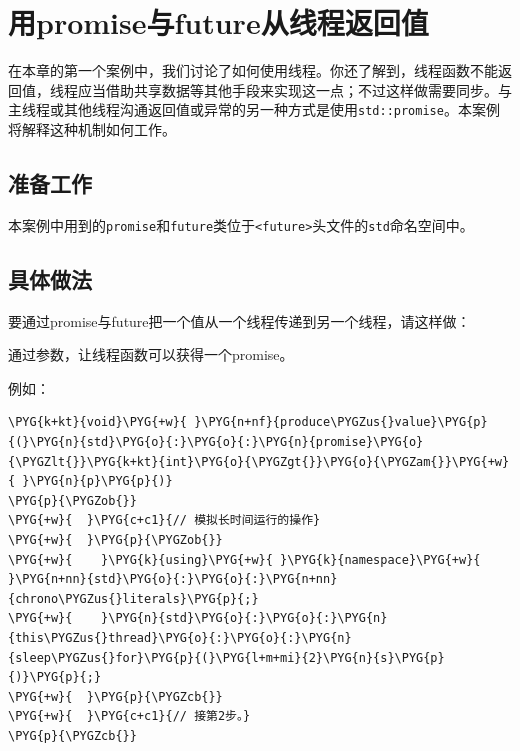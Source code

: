 
\section{用promise与future从线程返回值}



在本章的第一个案例中，我们讨论了如何使用线程。你还了解到，线程函数不能返回值，线程应当借助共享数据等其他手段来实现这一点；不过这样做需要同步。与主线程或其他线程沟通返回值或异常的另一种方式是使用\texttt{std::\allowbreak{}promise}。本案例将解释这种机制如何工作。



\subsection{准备工作}



本案例中用到的\texttt{promise}和\texttt{future}类位于\texttt{<\allowbreak{}future>}头文件的\texttt{std}命名空间中。



\subsection{具体做法}



要通过promise与future把一个值从一个线程传递到另一个线程，请这样做：



通过参数，让线程函数可以获得一个promise。



例如：



\begin{codeblockbg}
\begin{Verbatim}[commandchars=\\\{\},breaklines=true,breakanywhere=true,fontsize=\codefont,xleftmargin=17bp]
\PYG{k+kt}{void}\PYG{+w}{ }\PYG{n+nf}{produce\PYGZus{}value}\PYG{p}{(}\PYG{n}{std}\PYG{o}{:}\PYG{o}{:}\PYG{n}{promise}\PYG{o}{\PYGZlt{}}\PYG{k+kt}{int}\PYG{o}{\PYGZgt{}}\PYG{o}{\PYGZam{}}\PYG{+w}{ }\PYG{n}{p}\PYG{p}{)}
\PYG{p}{\PYGZob{}}
\PYG{+w}{  }\PYG{c+c1}{// 模拟长时间运行的操作}
\PYG{+w}{  }\PYG{p}{\PYGZob{}}
\PYG{+w}{    }\PYG{k}{using}\PYG{+w}{ }\PYG{k}{namespace}\PYG{+w}{ }\PYG{n+nn}{std}\PYG{o}{:}\PYG{o}{:}\PYG{n+nn}{chrono\PYGZus{}literals}\PYG{p}{;}
\PYG{+w}{    }\PYG{n}{std}\PYG{o}{:}\PYG{o}{:}\PYG{n}{this\PYGZus{}thread}\PYG{o}{:}\PYG{o}{:}\PYG{n}{sleep\PYGZus{}for}\PYG{p}{(}\PYG{l+m+mi}{2}\PYG{n}{s}\PYG{p}{)}\PYG{p}{;}
\PYG{+w}{  }\PYG{p}{\PYGZcb{}}
\PYG{+w}{  }\PYG{c+c1}{// 接第2步。}
\PYG{p}{\PYGZcb{}}
\end{Verbatim}
\end{codeblockbg}


